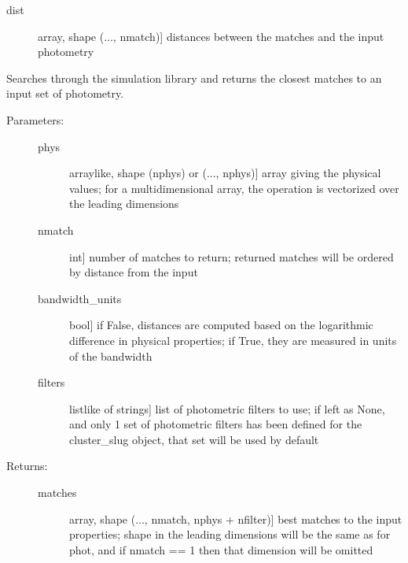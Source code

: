 \documentclass[letterpaper,10pt,english]{sphinxmanual}
\begin{document}
\begin{fulllineitems}
\begin{fulllineitems}
\begin{description}
\begin{description}
\item[{dist}] \leavevmode{[}array, shape (..., nmatch){]}
distances between the matches and the input photometry

\end{description}

\end{description}

\end{fulllineitems}


\begin{fulllineitems}
\label{cluster_slug:slugpy.cluster_slug.cluster_slug.bestmatch_phys}
Searches through the simulation library and returns the closest
matches to an input set of photometry.
\begin{description}
\item[{Parameters:}] \leavevmode\begin{description}
\item[{phys}] \leavevmode{[}arraylike, shape (nphys) or (..., nphys){]}
array giving the physical values; for a
multidimensional array, the operation is vectorized over
the leading dimensions

\item[{nmatch}] \leavevmode{[}int{]}
number of matches to return; returned matches will be
ordered by distance from the input

\item[{bandwidth\_units}] \leavevmode{[}bool{]}
if False, distances are computed based on the
logarithmic difference in physical properties; if True,
they are measured in units of the bandwidth

\item[{filters}] \leavevmode{[}listlike of strings{]}
list of photometric filters to use; if left as None, and
only 1 set of photometric filters has been defined for
the cluster\_slug object, that set will be used by
default

\end{description}

\item[{Returns:}] \leavevmode\begin{description}
\item[{matches}] \leavevmode{[}array, shape (..., nmatch, nphys + nfilter){]}
best matches to the input properties; shape in the
leading dimensions will be the same as for phot, and if
nmatch == 1 then that dimension will be omitted


\end{description}
\end{description}
\end{fulllineitems}
\end{fulllineitems}
\end{document}
